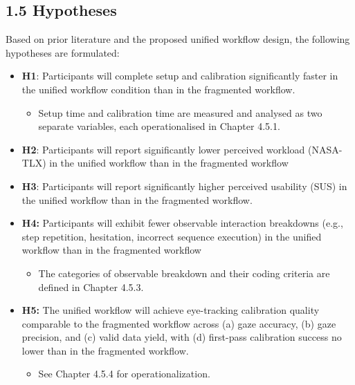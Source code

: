 \documentclass[
]{article}
\begin{document}
\hypertarget{hypotheses}{%
\subsection{1.5 Hypotheses}\label{hypotheses}}

Based on prior literature and the proposed unified workflow design, the following hypotheses are formulated:

\begin{itemize}
\item
  \textbf{H1}: Participants will complete setup and calibration significantly faster in the unified workflow condition than in the fragmented workflow.

  \begin{itemize}
  \item
  Setup time and calibration time are measured and analysed as two separate variables, each operationalised in Chapter 4.5.1.
  \end{itemize}
\item
  \textbf{H2}: Participants will report significantly lower perceived workload (NASA-TLX) in the unified workflow than in the fragmented workflow
\item
  \textbf{H3}: Participants will report significantly higher perceived usability (SUS) in the unified workflow than in the fragmented workflow.
\item
  \textbf{H4:} Participants will exhibit fewer observable interaction breakdowns (e.g., step repetition, hesitation, incorrect sequence execution) in the unified workflow than in the fragmented workflow

  \begin{itemize}
  \item
  The categories of observable breakdown and their coding criteria are defined in Chapter 4.5.3.
  \end{itemize}
\item
  \textbf{H5:} The unified workflow will achieve eye-tracking calibration quality comparable to the fragmented workflow across (a) gaze accuracy, (b) gaze precision, and (c) valid data yield, with (d) first-pass calibration success no lower than in the fragmented workflow.

  \begin{itemize}
  \item
  See Chapter 4.5.4 for operationalization.
  \end{itemize}
\end{itemize}
\end{document}
